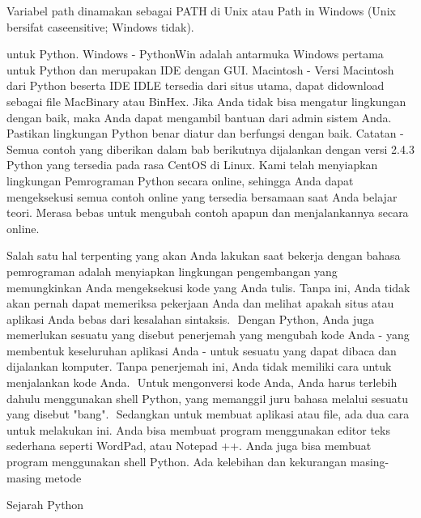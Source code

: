 \noindent 
{\fontsize{14pt}{14pt}\selectfont Variabel path dinamakan sebagai PATH di Unix atau Path in Windows (Unix bersifat caseensitive; Windows tidak). \\} \par
\vspace{14pt}
\noindent 
{\fontsize{14pt}{14pt}\selectfont untuk Python. Windows - PythonWin adalah antarmuka Windows pertama untuk Python dan merupakan IDE dengan GUI. Macintosh - Versi Macintosh dari Python beserta IDE IDLE tersedia dari situs utama, dapat didownload sebagai file MacBinary atau BinHex. Jika Anda tidak bisa mengatur lingkungan dengan baik, maka Anda dapat mengambil bantuan dari admin sistem Anda. Pastikan lingkungan Python benar diatur dan berfungsi dengan baik. Catatan - Semua contoh yang diberikan dalam bab berikutnya dijalankan dengan versi 2.4.3 Python yang tersedia pada rasa CentOS di Linux. Kami telah menyiapkan lingkungan Pemrograman Python secara online, sehingga Anda dapat mengeksekusi semua contoh online yang tersedia bersamaan saat Anda belajar teori. Merasa bebas untuk mengubah contoh apapun dan menjalankannya secara online. \\} \par
\vspace{14pt}
\noindent 
{\fontsize{14pt}{14pt}\selectfont \vspace{\baselineskip}
Salah satu hal terpenting yang akan Anda lakukan saat bekerja dengan bahasa pemrograman adalah menyiapkan lingkungan pengembangan yang memungkinkan Anda mengeksekusi kode yang Anda tulis. Tanpa ini, Anda tidak akan pernah dapat memeriksa pekerjaan Anda dan melihat apakah situs atau aplikasi Anda bebas dari kesalahan sintaksis.  $  $ Dengan Python, Anda juga memerlukan sesuatu yang disebut penerjemah yang mengubah kode Anda - yang membentuk keseluruhan aplikasi Anda - untuk sesuatu yang dapat dibaca dan dijalankan komputer. Tanpa penerjemah ini, Anda tidak memiliki cara untuk menjalankan kode Anda.  $  $ Untuk mengonversi kode Anda, Anda harus terlebih dahulu menggunakan shell Python, yang memanggil juru bahasa melalui sesuatu yang disebut "bang".  $  $ Sedangkan untuk membuat aplikasi atau file, ada dua cara untuk melakukan ini. Anda bisa membuat program menggunakan editor teks sederhana seperti WordPad, atau Notepad ++. Anda juga bisa membuat program menggunakan shell Python. Ada kelebihan dan kekurangan masing-masing metode \\} \par
\vspace{14pt}
\noindent 
{\fontsize{14pt}{14pt}\selectfont Sejarah Python \\} \par
